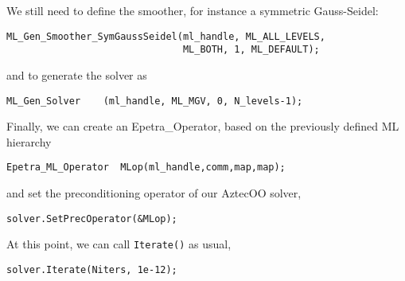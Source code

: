 We still need to define the smoother, for instance a symmetric Gauss-Seidel:
\begin{verbatim}
ML_Gen_Smoother_SymGaussSeidel(ml_handle, ML_ALL_LEVELS,
                               ML_BOTH, 1, ML_DEFAULT);
\end{verbatim}
and to generate the solver as
\begin{verbatim}
ML_Gen_Solver    (ml_handle, ML_MGV, 0, N_levels-1);
\end{verbatim}

Finally, we can create an Epetra\_Operator, based on the previously
defined ML hierarchy
\begin{verbatim}
Epetra_ML_Operator  MLop(ml_handle,comm,map,map);
\end{verbatim}
and set the preconditioning operator of our AztecOO solver,
\begin{verbatim}
solver.SetPrecOperator(&MLop);
\end{verbatim}
 
At this point, we can call \verb!Iterate()! as usual,
\begin{verbatim}
solver.Iterate(Niters, 1e-12);
\end{verbatim}

